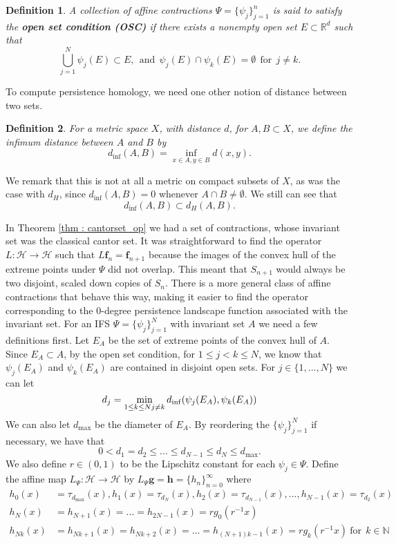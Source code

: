 \documentclass [52pt] {article}
\newcommand{\R}{\mathbb{R}}
\newcommand{\N}{\mathbb{N}}
\newcommand{\Hil}{\mathcal{H}}
\newtheorem{definition}{Definition}
\begin{document}
\begin{definition} A collection of affine contractions $\Psi = \{\psi_j\}_{j=1}^n$ is said to satisfy the {\bf{open set condition (OSC)}} if there exists a nonempty open set $E\subset\R^d$ such that 
\[\bigcup_{j=1}^N \psi_j(E)\subset E,\:\:\text{and}\:\:\psi_j(E)\cap\psi_k(E) = \emptyset\:\:\text{for}\:\:j\not=k.\]
\end{definition}

To compute persistence homology, we need one other notion of distance between two sets.
\begin{definition} For a metric space $X$, with distance $d$, for $A,B\subset X$, we define the infimum distance between $A$ and $B$ by
\[d_{\inf}(A,B) = \inf_{x\in A, y\in B}d(x,y).\]
\end{definition}
We remark that this is not at all a metric on compact subsets of $X$, as was the case with $d_H$, since $d_{\inf}(A,B) = 0$ whenever $A\cap B\not=\emptyset.$  We still can see that
\[d_{\inf}(A,B)\subset d_H(A,B).\]

In Theorem \ref{thm : cantorset_op} we had a set of contractions, whose invariant set was the classical cantor set.  It was straightforward to find the operator $L:\Hil\to\Hil$ such that $L\mathbf{f}_n = \mathbf{f}_{n+1}$ because the images of the convex hull of the extreme points under $\Psi$ did not overlap.  This meant that $S_{n+1}$ would always be two disjoint, scaled down copies of $S_n$.  There is a more general class of affine contractions that behave this way, making it easier to find the operator corresponding to the 0-degree persistence landscape function associated with the invariant set.  For an IFS $\Psi = \{\psi_{j}\}_{j=1}^N$ with invariant set $A$ we need a few definitions first.  Let $E_A$ be the set of extreme points of the convex hull of $A$.  Since $E_A\subset A$, by the open set condition, for $1\le j<k\le N$, we know that $\psi_j(E_A)$ and $\psi_k(E_A)$ are contained in disjoint open sets.  For $j\in \{1,...,N\}$ we can let
\[d_j = \min_{1\le k\le N\\ j\not= k}d_{\inf}(\psi_j(E_A),\psi_k(E_A))\]
We can also let $d_{\max}$ be the diameter of $E_A$.  By reordering the $\{\psi_j\}_{j=1}^N$ if necessary, we have that
\[0<d_1= d_2\le...\le d_{N-1}\le d_N\le d_{\max}.\]
We also define $r\in(0,1)$ to be the Lipschitz constant for each $\psi_j\in\Psi$.  Define the affine map $L_\Psi:\Hil \to\Hil$ by
$L_\Psi\mathbf{g} = \mathbf{h} = \{h_n\}_{n=0}^\infty$ where
\begin{equation}\label{eq : Lpsi_op}
\begin{split}
h_0(x) &= \tau_{d_{\max}}(x), h_1(x) = \tau_{d_N}(x), h_2(x) = \tau_{d_{N-1}}(x),...,h_{N-1}(x) = \tau_{d_2}(x)\\
h_N(x) &=h_{N+1}(x) = ... = h_{2N-1}(x) = rg_0(r^{-1}x)\\
h_{Nk}(x)&=h_{Nk +1}(x)= h_{Nk+2}(x) = ... =  h_{(N+1)k-1}(x) = rg_k(r^{-1}x)\:\text{for}\:\:k\in\N\\
\end{split}
\end{equation}
\end{document}

